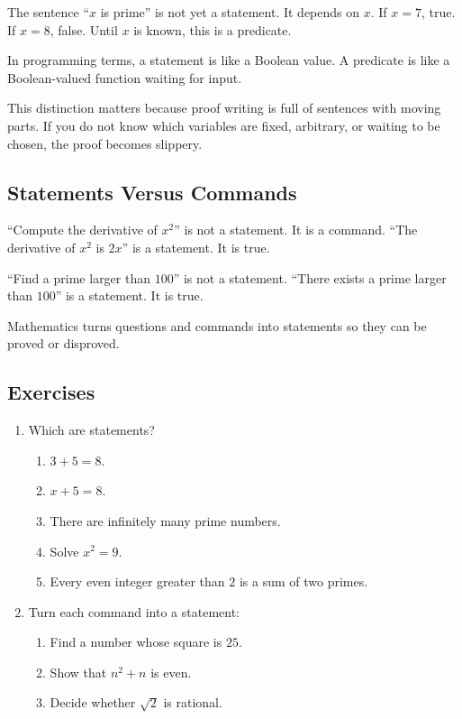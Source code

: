 \documentclass[11pt]{article}
\begin{document}
\begin{example}
The sentence ``$x$ is prime'' is not yet a statement. It depends on $x$. If $x=7$, true. If $x=8$, false. Until $x$ is known, this is a predicate.
\end{example}

\begin{intuitionbox}
In programming terms, a statement is like a Boolean value. A predicate is like a Boolean-valued function waiting for input.
\end{intuitionbox}

This distinction matters because proof writing is full of sentences with moving parts. If you do not know which variables are fixed, arbitrary, or waiting to be chosen, the proof becomes slippery.

\subsection{Statements Versus Commands}

``Compute the derivative of $x^2$'' is not a statement. It is a command. ``The derivative of $x^2$ is $2x$'' is a statement. It is true.

``Find a prime larger than $100$'' is not a statement. ``There exists a prime larger than $100$'' is a statement. It is true.

Mathematics turns questions and commands into statements so they can be proved or disproved.

\subsection{Exercises}

\begin{enumerate}
\item Which are statements?
\begin{enumerate}
\item $3+5=8$.
\item $x+5=8$.
\item There are infinitely many prime numbers.
\item Solve $x^2=9$.
\item Every even integer greater than $2$ is a sum of two primes.
\end{enumerate}
\item Turn each command into a statement:
\begin{enumerate}
\item Find a number whose square is $25$.
\item Show that $n^2+n$ is even.
\item Decide whether $\sqrt2$ is rational.
\end{enumerate}
\end{enumerate}
\end{document}
